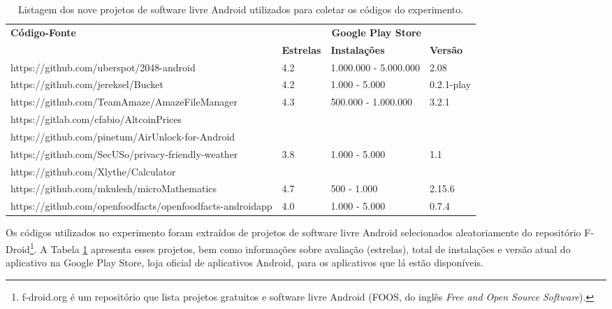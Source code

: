 \begin{table}
\centering
\renewcommand*{\arraystretch}{1}
\footnotesize
\caption{Listagem dos nove projetos de software livre Android utilizados para coletar os códigos do experimento.} 
\begin{tabular}{@{}p{9cm}lll@{}}
\toprule
\multirow{2}{*}{\textbf{Código-Fonte}} & \multicolumn{3}{c}{\textbf{Google Play Store}} \\ \cmidrule{2-4}
                                       & \textbf{Estrelas}    & \textbf{Instalações}    & \textbf{Versão} \\
\bottomrule
https://github.com/uberspot/2048-android & 4.2 &  1.000.000 - 5.000.000 & 2.08 \\
https://github.com/jereksel/Bucket & 4.2 &  1.000 - 5.000 & 0.2.1-play \\
https://github.com/TeamAmaze/AmazeFileManager & 4.3 &  500.000 - 1.000.000 & 3.2.1 \\
https://gitlab.com/cfabio/AltcoinPrices &  &   &  \\
https://github.com/pinetum/AirUnlock-for-Android &  &   &  \\
https://github.com/SecUSo/privacy-friendly-weather & 3.8 &  1.000 - 5.000 & 1.1 \\
https://github.com/Xlythe/Calculator &  &   &  \\
https://github.com/mkulesh/microMathematics & 4.7 &  500 - 1.000 & 2.15.6 \\
https://github.com/openfoodfacts/openfoodfacts-androidapp & 4.0 &  1.000 - 5.000 & 0.7.4 \\
\bottomrule
\end{tabular}
\label{tab:android-projects}
\end{table}

Os códigos utilizados no experimento foram extraídos de projetos de software livre Android selecionados aleatoriamente do repositório F-Droid\footnote{f-droid.org é um repositório que lista projetos gratuitos e software livre Android (FOOS, do inglês \textit{Free and Open Source Software}).}. A Tabela \ref{tab:android-projects} apresenta esses projetos, bem como informações sobre avaliação (estrelas), total de instalações e versão atual do aplicativo na Google Play Store, loja oficial de aplicativos Android, para os aplicativos que lá estão disponíveis. 


